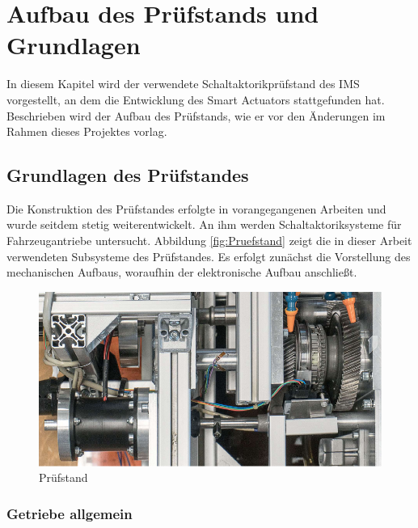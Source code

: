 \chapter{Aufbau des Prüfstands und Grundlagen}\label{kap2}
In diesem Kapitel wird der verwendete Schaltaktorikprüfstand des IMS vorgestellt, an dem  die Entwicklung des Smart Actuators stattgefunden hat. Beschrieben wird der Aufbau des Prüfstands, wie er vor den Änderungen im Rahmen dieses Projektes vorlag.
\section{Grundlagen des Prüfstandes}
Die Konstruktion des Prüfstandes erfolgte in vorangegangenen Arbeiten und wurde seitdem stetig weiterentwickelt. An ihm werden Schaltaktoriksysteme für Fahrzeugantriebe untersucht. Abbildung \autoref{fig:Pruefstand} zeigt die in dieser Arbeit verwendeten Subsysteme des Prüfstandes. Es erfolgt zunächst die Vorstellung des mechanischen Aufbaus, woraufhin der elektronische Aufbau anschließt. 
\begin{figure}[h]
	\centering
		\includegraphics{Bilder/Pruefstand.pdf}
	\caption{Prüfstand \cite[S.5]{adp}}
	\label{fig:Pruefstand}
\end{figure} \noindent
\subsection{Getriebe allgemein}

